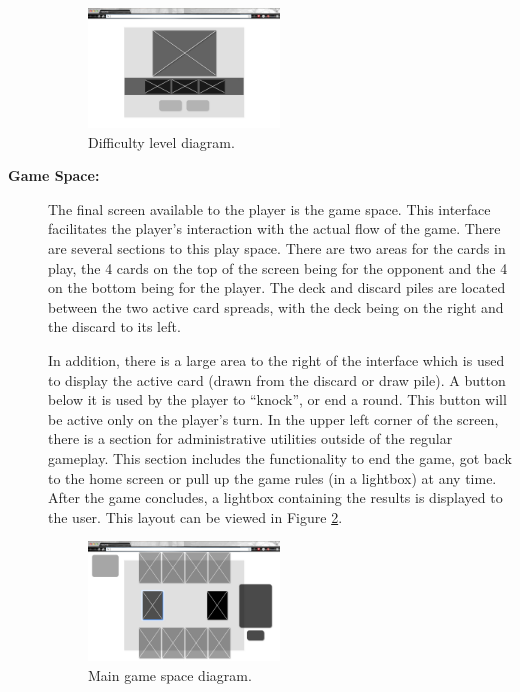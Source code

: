 \documentclass[12pt]{IEEEtran}
\begin{document}
\begin{description}
	\begin{figure}[h]
		\centering
		\includegraphics[width=0.5\textwidth]{5_ChooseDifficulty.jpg}
		\caption{Difficulty level diagram. }
		\label{fig:difficulty}
	\end{figure}
	
	\item[\textbf{Game Space:}] \hspace{4em} The final screen available to the player is the game space. This interface facilitates the player’s interaction with the actual flow of the game. There are several sections to this play space. There are two areas for the cards in play, the 4 cards on the top of the screen being for the opponent and the 4 on the bottom being for the player. The deck and discard piles are located between the two active card spreads, with the deck being on the right and the discard to its left. 
	
	In addition, there is a large area to the right of the interface which is used to display the active card (drawn from the discard or draw pile). A button below it is used by the player to “knock”, or end a round. This button will be active only on the player’s turn. In the upper left corner of the screen, there is a section for administrative utilities outside of the regular gameplay. This section includes the functionality to end the game, got back to the home screen or pull up the game rules (in a lightbox) at any time. After the game concludes, a lightbox containing the results is displayed to the user. This layout can be viewed in Figure \ref{fig:gamespace}.

	\begin{figure}[h]
		\centering
		\includegraphics[width=0.5\textwidth]{6_GameSpace.jpg}
		\caption{Main game space diagram. }
		\label{fig:gamespace}
	\end{figure}


\end{description}
\end{document}
